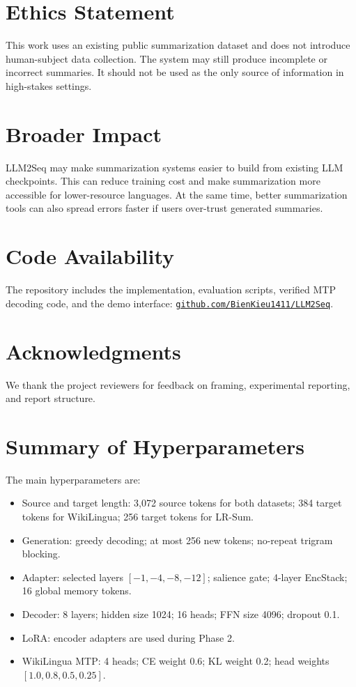 \documentclass[11pt]{article}
\begin{document}
\section*{Ethics Statement}

This work uses an existing public summarization dataset and does not introduce human-subject data collection.
The system may still produce incomplete or incorrect summaries.
It should not be used as the only source of information in high-stakes settings.

\section*{Broader Impact}

LLM2Seq may make summarization systems easier to build from existing LLM checkpoints.
This can reduce training cost and make summarization more accessible for lower-resource languages.
At the same time, better summarization tools can also spread errors faster if users over-trust generated summaries.

\section*{Code Availability}

The repository includes the implementation, evaluation scripts, verified MTP decoding code, and the demo interface:
\href{https://github.com/BienKieu1411/LLM2Seq}{\texttt{github.com/BienKieu1411/LLM2Seq}}.

\section*{Acknowledgments}

We thank the project reviewers for feedback on framing, experimental reporting, and report structure.



\appendix

\section{Summary of Hyperparameters}
\label{app:hparams}

The main hyperparameters are:
\begin{itemize}
    \item Source and target length: 3,072 source tokens for both datasets; 384 target tokens for WikiLingua; 256 target tokens for LR-Sum.
    \item Generation: greedy decoding; at most 256 new tokens; no-repeat trigram blocking.
    \item Adapter: selected layers $[-1,-4,-8,-12]$; salience gate; 4-layer EncStack; 16 global memory tokens.
    \item Decoder: 8 layers; hidden size 1024; 16 heads; FFN size 4096; dropout 0.1.
    \item LoRA: encoder adapters are used during Phase 2.
    \item WikiLingua MTP: 4 heads; CE weight 0.6; KL weight 0.2; head weights $[1.0,0.8,0.5,0.25]$.
\end{itemize}
\end{document}
